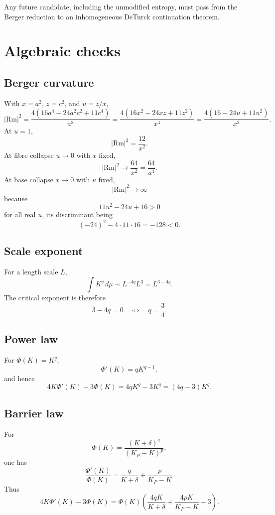 \documentclass[11pt]{amsart}
\newcommand{\Rm}{\mathrm{Rm}}
\newcommand{\KP}{K_{\!P}}
\begin{document}
Any future candidate, including the unmodified entropy, must pass from the
Berger reduction to an inhomogeneous DeTurck continuation theorem.

\appendix

\section{Algebraic checks}

\subsection{Berger curvature}

With \(x=a^2\), \(z=c^2\), and \(u=z/x\),
\[
        |\Rm|^2
        =
        \frac{4(16a^4-24a^2c^2+11c^4)}{a^8}
        =
        \frac{4(16x^2-24xz+11z^2)}{x^4}
        =
        \frac{4(16-24u+11u^2)}{x^2}.
\]
At \(u=1\),
\[
        |\Rm|^2=\frac{12}{x^2}.
\]
At fibre collapse \(u\to0\) with \(x\) fixed,
\[
        |\Rm|^2\to \frac{64}{x^2}=\frac{64}{a^4}.
\]
At base collapse \(x\to0\) with \(u\) fixed,
\[
        |\Rm|^2\to\infty
\]
because
\[
        11u^2-24u+16>0
\]
for all real \(u\), its discriminant being
\[
        (-24)^2-4\cdot 11\cdot 16=-128<0.
\]

\subsection{Scale exponent}

For a length scale \(L\),
\[
        \int K^q\,d\mu
        \sim
        L^{-4q}L^3
        =
        L^{3-4q}.
\]
The critical exponent is therefore
\[
        3-4q=0
        \quad\Longleftrightarrow\quad
        q=\frac34.
\]

\subsection{Power law}

For \(\Phi(K)=K^q\),
\[
        \Phi'(K)=qK^{q-1},
\]
and hence
\[
        4K\Phi'(K)-3\Phi(K)
        =
        4qK^q-3K^q
        =
        (4q-3)K^q.
\]

\subsection{Barrier law}

For
\[
        \Phi(K)=\frac{(K+\delta)^q}{(\KP-K)^p},
\]
one has
\[
        \frac{\Phi'(K)}{\Phi(K)}
        =
        \frac{q}{K+\delta}
        +
        \frac{p}{\KP-K}.
\]
Thus
\[
        4K\Phi'(K)-3\Phi(K)
        =
        \Phi(K)
        \left(
        \frac{4qK}{K+\delta}
        +
        \frac{4pK}{\KP-K}
        -3
        \right).
\]
\end{document}
